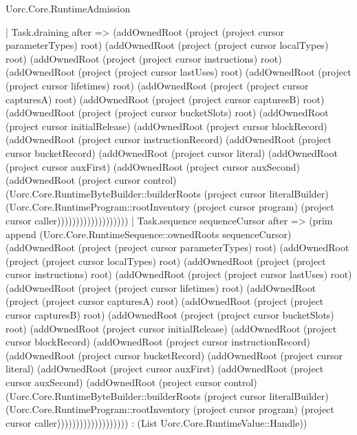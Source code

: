 \begin{lexlean}{Uorc.Core.RuntimeAdmission}
\begin{semanticmodule}
{    | Task.draining after => (addOwnedRoot (project (project cursor parameterTypes) root) (addOwnedRoot (project (project cursor localTypes) root) (addOwnedRoot (project (project cursor instructions) root) (addOwnedRoot (project (project cursor lastUses) root) (addOwnedRoot (project (project cursor lifetimes) root) (addOwnedRoot (project (project cursor capturesA) root) (addOwnedRoot (project (project cursor capturesB) root) (addOwnedRoot (project (project cursor bucketSlots) root) (addOwnedRoot (project cursor initialRelease) (addOwnedRoot (project cursor blockRecord) (addOwnedRoot (project cursor instructionRecord) (addOwnedRoot (project cursor bucketRecord) (addOwnedRoot (project cursor literal) (addOwnedRoot (project cursor auxFirst) (addOwnedRoot (project cursor auxSecond) (addOwnedRoot (project cursor control) (Uorc.Core.RuntimeByteBuilder::builderRoots (project cursor literalBuilder) (Uorc.Core.RuntimeProgram::rootInventory (project cursor program) (project cursor caller)))))))))))))))))))
    | Task.sequence sequenceCursor after => (prim append (Uorc.Core.RuntimeSequence::ownedRoots sequenceCursor) (addOwnedRoot (project (project cursor parameterTypes) root) (addOwnedRoot (project (project cursor localTypes) root) (addOwnedRoot (project (project cursor instructions) root) (addOwnedRoot (project (project cursor lastUses) root) (addOwnedRoot (project (project cursor lifetimes) root) (addOwnedRoot (project (project cursor capturesA) root) (addOwnedRoot (project (project cursor capturesB) root) (addOwnedRoot (project (project cursor bucketSlots) root) (addOwnedRoot (project cursor initialRelease) (addOwnedRoot (project cursor blockRecord) (addOwnedRoot (project cursor instructionRecord) (addOwnedRoot (project cursor bucketRecord) (addOwnedRoot (project cursor literal) (addOwnedRoot (project cursor auxFirst) (addOwnedRoot (project cursor auxSecond) (addOwnedRoot (project cursor control) (Uorc.Core.RuntimeByteBuilder::builderRoots (project cursor literalBuilder) (Uorc.Core.RuntimeProgram::rootInventory (project cursor program) (project cursor caller))))))))))))))))))) : (List Uorc.Core.RuntimeValue::Handle))
}
\end{semanticmodule}
\end{lexlean}

